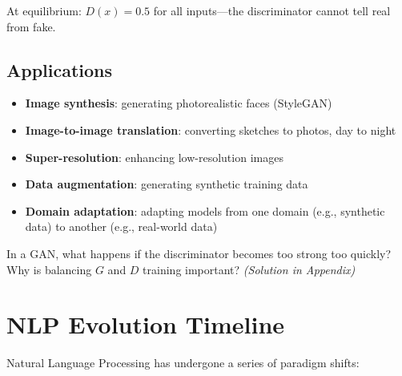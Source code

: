 \documentclass[11pt,a4paper]{article}
\begin{document}
At equilibrium: $D(x) = 0.5$ for all inputs---the discriminator cannot tell real from fake.

\subsection{Applications}

\begin{itemize}[leftmargin=1.5em]
    \item \textbf{Image synthesis}: generating photorealistic faces (StyleGAN)
    \item \textbf{Image-to-image translation}: converting sketches to photos, day to night
    \item \textbf{Super-resolution}: enhancing low-resolution images
    \item \textbf{Data augmentation}: generating synthetic training data
    \item \textbf{Domain adaptation}: adapting models from one domain (e.g., synthetic data) to another (e.g., real-world data)
\end{itemize}

\begin{tcolorbox}[questionbox={Self-Check Q4}]
In a GAN, what happens if the discriminator becomes too strong too quickly? Why is balancing $G$ and $D$ training important? \textit{(Solution in Appendix)}
\end{tcolorbox}

\section{NLP Evolution Timeline}

Natural Language Processing has undergone a series of paradigm shifts:
\end{document}
